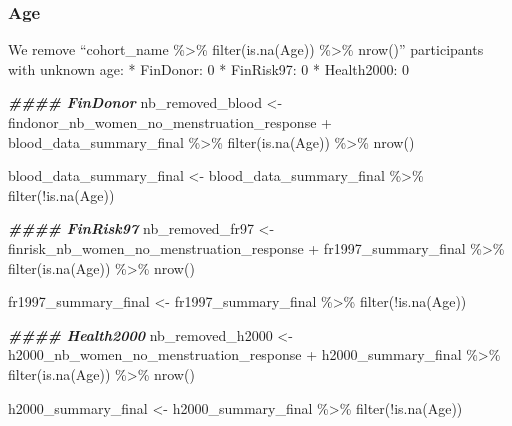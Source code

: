 \documentclass[
]{article}
\newenvironment{Shaded}{\begin{snugshade}}{\end{snugshade}}
\newcommand{\DocumentationTok}[1]{\textcolor[rgb]{0.56,0.35,0.01}{\textbf{\textit{#1}}}}
\newcommand{\FunctionTok}[1]{\textcolor[rgb]{0.00,0.00,0.00}{#1}}
\newcommand{\NormalTok}[1]{#1}
\newcommand{\OtherTok}[1]{\textcolor[rgb]{0.56,0.35,0.01}{#1}}
\newcommand{\SpecialCharTok}[1]{\textcolor[rgb]{0.00,0.00,0.00}{#1}}
\begin{document}
\hypertarget{age}{%
\subsubsection{Age}\label{age}}

We remove ``cohort\_name \%\textgreater\% filter(is.na(Age))
\%\textgreater\% nrow()'' participants with unknown age: * FinDonor: 0 *
FinRisk97: 0 * Health2000: 0

\begin{Shaded}
\begin{Highlighting}[]
\DocumentationTok{\#\#\#\# FinDonor}
\NormalTok{nb\_removed\_blood }\OtherTok{\textless{}{-}}\NormalTok{ findonor\_nb\_women\_no\_menstruation\_response }\SpecialCharTok{+}
\NormalTok{                            blood\_data\_summary\_final }\SpecialCharTok{\%\textgreater{}\%} \FunctionTok{filter}\NormalTok{(}\FunctionTok{is.na}\NormalTok{(Age)) }\SpecialCharTok{\%\textgreater{}\%} \FunctionTok{nrow}\NormalTok{() }

\NormalTok{blood\_data\_summary\_final }\OtherTok{\textless{}{-}}\NormalTok{ blood\_data\_summary\_final }\SpecialCharTok{\%\textgreater{}\%} 
  \FunctionTok{filter}\NormalTok{(}\SpecialCharTok{!}\FunctionTok{is.na}\NormalTok{(Age))}

\DocumentationTok{\#\#\#\# FinRisk97}
\NormalTok{nb\_removed\_fr97 }\OtherTok{\textless{}{-}}\NormalTok{ finrisk\_nb\_women\_no\_menstruation\_response }\SpecialCharTok{+}
\NormalTok{                            fr1997\_summary\_final }\SpecialCharTok{\%\textgreater{}\%} \FunctionTok{filter}\NormalTok{(}\FunctionTok{is.na}\NormalTok{(Age)) }\SpecialCharTok{\%\textgreater{}\%} \FunctionTok{nrow}\NormalTok{() }

\NormalTok{fr1997\_summary\_final }\OtherTok{\textless{}{-}}\NormalTok{ fr1997\_summary\_final }\SpecialCharTok{\%\textgreater{}\%} 
  \FunctionTok{filter}\NormalTok{(}\SpecialCharTok{!}\FunctionTok{is.na}\NormalTok{(Age))}

\DocumentationTok{\#\#\#\# Health2000}
\NormalTok{nb\_removed\_h2000 }\OtherTok{\textless{}{-}}\NormalTok{ h2000\_nb\_women\_no\_menstruation\_response }\SpecialCharTok{+}
\NormalTok{                            h2000\_summary\_final }\SpecialCharTok{\%\textgreater{}\%} \FunctionTok{filter}\NormalTok{(}\FunctionTok{is.na}\NormalTok{(Age)) }\SpecialCharTok{\%\textgreater{}\%} \FunctionTok{nrow}\NormalTok{() }

\NormalTok{h2000\_summary\_final }\OtherTok{\textless{}{-}}\NormalTok{ h2000\_summary\_final }\SpecialCharTok{\%\textgreater{}\%} 
  \FunctionTok{filter}\NormalTok{(}\SpecialCharTok{!}\FunctionTok{is.na}\NormalTok{(Age))}
\end{Highlighting}
\end{Shaded}
\end{document}
